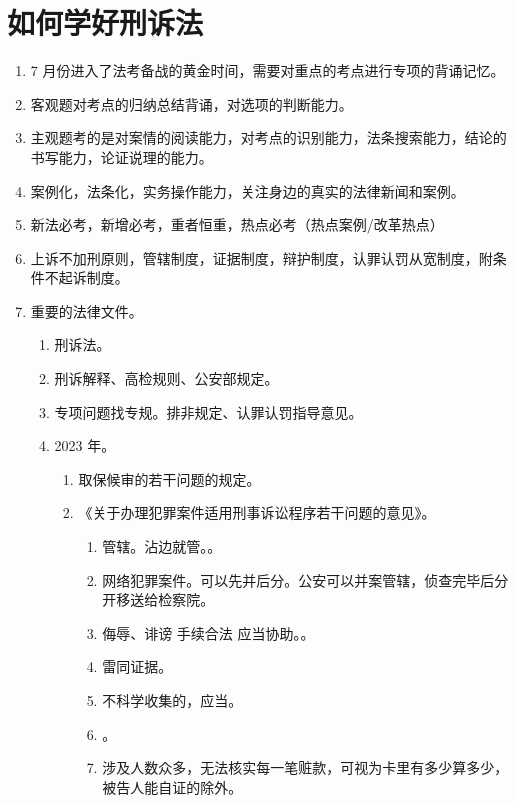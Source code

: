 \section{如何学好刑诉法}
\begin{enumerate}
  \item 7 月份进入了法考备战的黄金时间，需要对重点的考点进行专项的背诵记忆。
  \item 客观题对考点的归纳总结背诵，对选项的判断能力。
  \item 主观题考的是对案情的阅读能力，对考点的识别能力，法条搜索能力，结论的书写能力，论证说理的能力。
  \item 案例化，法条化，实务操作能力，关注身边的真实的法律新闻和案例。
  \item 新法必考，新增必考，重者恒重，热点必考（热点案例/改革热点）
  \item 上诉不加刑原则，管辖制度，证据制度，辩护制度，认罪认罚从宽制度，附条件不起诉制度。
  \item 重要的法律文件。
        \begin{enumerate}
          \item 刑诉法。
          \item 刑诉解释、高检规则、公安部规定。
          \item 专项问题找专规。排非规定、认罪认罚指导意见。
          \item 2023 年。
                \begin{enumerate}
                  \item 取保候审的若干问题的规定。
                  \item 《关于办理犯罪案件适用刑事诉讼程序若干问题的意见》。
                        \begin{enumerate}
                          \item 管辖。沾边就管。。
                          \item 网络犯罪案件。可以先并后分。公安可以并案管辖，侦查完毕后分开移送给检察院。
                          \item 侮辱、诽谤 \yjt 手续合法 \yjt 应当协助。。
                          \item 雷同证据。
                          \item 不科学收集的，应当。
                          \item {}。
                          \item 涉及人数众多，无法核实每一笔赃款，可视为卡里有多少算多少，被告人能自证的除外。

\end{enumerate}
\end{enumerate}
\end{enumerate}
\end{enumerate}
